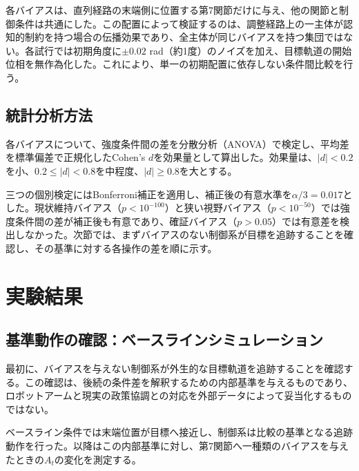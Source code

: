 各バイアスは、直列経路の末端側に位置する第7関節だけに与え、他の関節と制御条件は共通にした。この配置によって検証するのは、調整経路上の一主体が認知的制約を持つ場合の伝播効果であり、全主体が同じバイアスを持つ集団ではない。各試行では初期角度に$\pm 0.02$ rad（約1度）のノイズを加え、目標軌道の開始位相を無作為化した。これにより、単一の初期配置に依存しない条件間比較を行う。

\subsection{統計分析方法}

各バイアスについて、強度条件間の差を分散分析（ANOVA）で検定し、平均差を標準偏差で正規化したCohen's $d$を効果量として算出した。効果量は、$|d| < 0.2$を小、$0.2 \leq |d| < 0.8$を中程度、$|d| \geq 0.8$を大とする。

三つの個別検定にはBonferroni補正を適用し、補正後の有意水準を$\alpha/3 = 0.017$とした。現状維持バイアス（$p < 10^{-100}$）と狭い視野バイアス（$p < 10^{-50}$）では強度条件間の差が補正後も有意であり、確証バイアス（$p > 0.05$）では有意差を検出しなかった。次節では、まずバイアスのない制御系が目標を追跡することを確認し、その基準に対する各操作の差を順に示す。

\section{実験結果}
\label{sec:ch3_results}

\subsection{基準動作の確認：ベースラインシミュレーション}

最初に、バイアスを与えない制御系が外生的な目標軌道を追跡することを確認する。この確認は、後続の条件差を解釈するための内部基準を与えるものであり、ロボットアームと現実の政策協調との対応を外部データによって妥当化するものではない。

ベースライン条件では末端位置が目標へ接近し、制御系は比較の基準となる追跡動作を行った。以降はこの内部基準に対し、第7関節へ一種類のバイアスを与えたときの$A_t$の変化を測定する。

